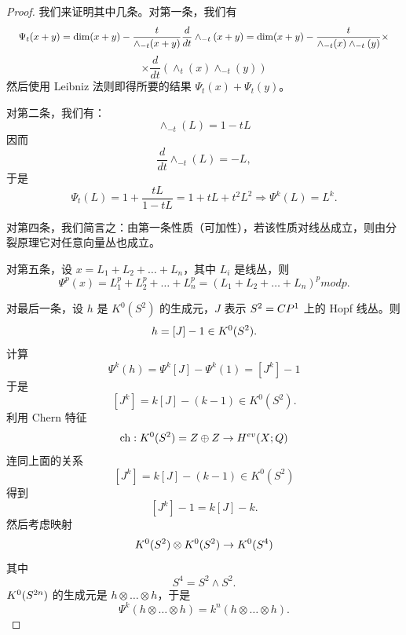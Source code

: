 \begin{proof}
我们来证明其中几条。对第一条，我们有
\[ \resizebox{0.98\textwidth}{!}{$\displaystyle \Psi_t(x+y) = \dim(x+y)-\frac{t}{\wedge_{-t}(x+y)}\frac{d}{dt}\wedge_{-t}(x+y) = \dim(x+y)-\frac{t}{\wedge_{-t}(x)\wedge_{-t}(y)}\times$} \]
\[ \times \frac{d}{dt}(\wedge_t(x)\wedge_{-t}(y)) \]
然后使用 Leibniz 法则即得所要的结果 $\Psi_t(x)+\Psi_t(y)$。

对第二条，我们有：
\[ \wedge_{-t}(L) = 1-tL \]
因而
\[ \frac{d}{dt}\wedge_{-t}(L) = -L, \]
于是
\[ \Psi_t(L) = 1+\frac{tL}{1-tL} = 1+tL+t^2L^2\Rightarrow \Psi^k(L) = L^k. \]

对第四条，我们简言之：由第一条性质（可加性），若该性质对线丛成立，则由分裂原理它对任意向量丛也成立。

对第五条，设 $x = L_1+L_2+\ldots+L_n$，其中 $L_i$ 是线丛，则
\[ \Psi^p(x) = L_1^p+L_2^p+\ldots+L_n^p = (L_1+L_2+\ldots+L_n)^p modp. \]

对最后一条，设 $h$ 是 $K^0(S^2)$ 的生成元，$J$ 表示 $S^2 = C P^1$ 上的 Hopf 线丛。则
\[ h = [J]-1\in  K^0(S^2). \]
计算
\[ \Psi^k(h) = \Psi^k[J]-\Psi^k(1) = [J^k]-1 \]
于是
\[ [J^k] = k[J]-(k-1)\in K^0(S^2). \]
利用 Chern 特征
\[ \operatorname{ch} : K^0(S^2) = Z\oplus Z\to H^{ev}(X;Q) \]
连同上面的关系
\[ [J^k] = k[J]-(k-1)\in K^0(S^2) \]
得到
\[ [J^k]-1 = k[J]-k. \]
然后考虑映射
\[  K^0(S^2)\otimes K^0(S^2)\to K^0(S^4) \]
其中
\[ S^4 = S^2\wedge S^2. \]
$ K^0(S^{2n})$ 的生成元是 $h\otimes\ldots\otimes h$，于是
\[ \Psi^k(h\otimes\ldots\otimes h) = k^n(h\otimes\ldots\otimes h). \]
\end{proof}
